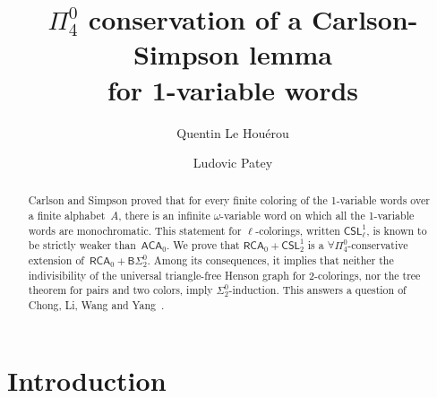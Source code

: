 \documentclass{article}
\author{Quentin Le Hou\'erou \and Ludovic Patey}
\title{$\Pi^0_4$ conservation of a Carlson-Simpson lemma\\ for 1-variable words}
\numberwithin{theorem}{section}
\newcommand{\RCA}{\mathsf{RCA}}
\newcommand{\ACA}{\mathsf{ACA}}
\newcommand{\CSL}{\mathsf{CSL}}
\newcommand{\BSig}{\mathsf{B}\Sigma^0}
\begin{document}
\maketitle

\begin{abstract}
Carlson and Simpson proved that for every finite coloring of the 1-variable words over a finite alphabet~$A$, there is an infinite $\omega$-variable word on which all the 1-variable words are monochromatic. This statement for $\ell$-colorings, written $\CSL^1_\ell$, is known to be strictly weaker than~$\ACA_0$. We prove that $\RCA_0 + \CSL^1_2$ is a $\forall \Pi^0_4$-conservative extension of~$\RCA_0 + \BSig_2$. Among its consequences, it implies that neither the indivisibility of the universal triangle-free Henson graph for 2-colorings, nor the tree theorem for pairs and two colors, imply $\Sigma^0_2$-induction. This answers a question of Chong, Li, Wang and Yang~\cite{chong2020strength}.
\end{abstract}

\section{Introduction}
\end{document}
